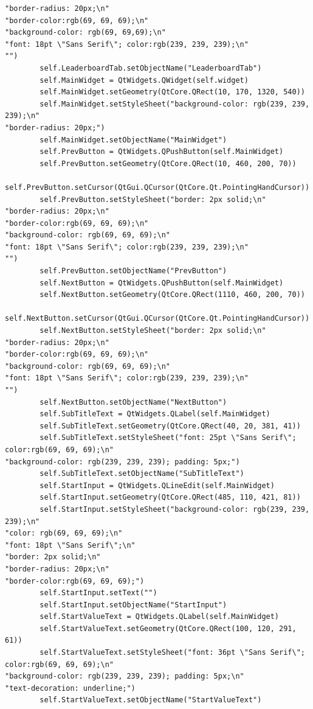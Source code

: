 \documentclass[12pt]{article}
\begin{document}
\begin{lstlisting}
"border-radius: 20px;\n"
"border-color:rgb(69, 69, 69);\n"
"background-color: rgb(69, 69,69);\n"
"font: 18pt \"Sans Serif\"; color:rgb(239, 239, 239);\n"
"")
        self.LeaderboardTab.setObjectName("LeaderboardTab")
        self.MainWidget = QtWidgets.QWidget(self.widget)
        self.MainWidget.setGeometry(QtCore.QRect(10, 170, 1320, 540))
        self.MainWidget.setStyleSheet("background-color: rgb(239, 239, 239);\n"
"border-radius: 20px;")
        self.MainWidget.setObjectName("MainWidget")
        self.PrevButton = QtWidgets.QPushButton(self.MainWidget)
        self.PrevButton.setGeometry(QtCore.QRect(10, 460, 200, 70))
        self.PrevButton.setCursor(QtGui.QCursor(QtCore.Qt.PointingHandCursor))
        self.PrevButton.setStyleSheet("border: 2px solid;\n"
"border-radius: 20px;\n"
"border-color:rgb(69, 69, 69);\n"
"background-color: rgb(69, 69, 69);\n"
"font: 18pt \"Sans Serif\"; color:rgb(239, 239, 239);\n"
"")
        self.PrevButton.setObjectName("PrevButton")
        self.NextButton = QtWidgets.QPushButton(self.MainWidget)
        self.NextButton.setGeometry(QtCore.QRect(1110, 460, 200, 70))
        self.NextButton.setCursor(QtGui.QCursor(QtCore.Qt.PointingHandCursor))
        self.NextButton.setStyleSheet("border: 2px solid;\n"
"border-radius: 20px;\n"
"border-color:rgb(69, 69, 69);\n"
"background-color: rgb(69, 69, 69);\n"
"font: 18pt \"Sans Serif\"; color:rgb(239, 239, 239);\n"
"")
        self.NextButton.setObjectName("NextButton")
        self.SubTitleText = QtWidgets.QLabel(self.MainWidget)
        self.SubTitleText.setGeometry(QtCore.QRect(40, 20, 381, 41))
        self.SubTitleText.setStyleSheet("font: 25pt \"Sans Serif\"; color:rgb(69, 69, 69);\n"
"background-color: rgb(239, 239, 239); padding: 5px;")
        self.SubTitleText.setObjectName("SubTitleText")
        self.StartInput = QtWidgets.QLineEdit(self.MainWidget)
        self.StartInput.setGeometry(QtCore.QRect(485, 110, 421, 81))
        self.StartInput.setStyleSheet("background-color: rgb(239, 239, 239);\n"
"color: rgb(69, 69, 69);\n"
"font: 18pt \"Sans Serif\";\n"
"border: 2px solid;\n"
"border-radius: 20px;\n"
"border-color:rgb(69, 69, 69);")
        self.StartInput.setText("")
        self.StartInput.setObjectName("StartInput")
        self.StartValueText = QtWidgets.QLabel(self.MainWidget)
        self.StartValueText.setGeometry(QtCore.QRect(100, 120, 291, 61))
        self.StartValueText.setStyleSheet("font: 36pt \"Sans Serif\"; color:rgb(69, 69, 69);\n"
"background-color: rgb(239, 239, 239); padding: 5px;\n"
"text-decoration: underline;")
        self.StartValueText.setObjectName("StartValueText")

\end{lstlisting}
\end{document}
